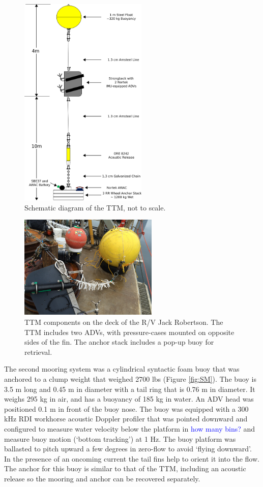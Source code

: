 \documentclass[twocol]{ametsoc}
\newcommand{\note}[1]{\textcolor{blue}{#1}}
\begin{document}
\begin{figure}[t]
  \centering
  \includegraphics[width=2.4in]{ttm04b}
  \caption{Schematic diagram of the TTM, not to scale.}
  \label{fig:ttm:diagram}
\end{figure}

\begin{figure}[t]
  \centering
  \includegraphics[width=2.6in]{TTM_image01}  
  \caption{TTM components on the deck of the R/V Jack Robertson. The TTM includes two ADVs, with pressure-cases mounted on opposite sides of the fin. The anchor stack includes a pop-up buoy for retrieval. }
  \label{fig:ttm:photo}
\end{figure}

The second mooring system was a cylindrical syntactic foam buoy that was anchored to a clump weight that weighed 2700 lbs (Figure \ref{fig:SM}). The buoy is 3.5 m long and 0.45 m in diameter with a tail ring that is 0.76 m in diameter. It weighs 295 kg in air, and has a buoyancy of 185 kg in water. An ADV head was positioned 0.1 m in front of the buoy nose.  The buoy was equipped with a 300 kHz RDI workhorse acoustic Doppler profiler that was pointed downward and configured to measure water velocity below the platform in \note{how many bins?} and measure buoy motion (`bottom tracking') at 1 Hz. The buoy platform was ballasted to pitch upward a few degrees in zero-flow to avoid `flying downward'. In the presence of an oncoming current the tail fins help to orient it into the flow. The anchor for this buoy is similar to that of the TTM, including an acoustic release so the mooring and anchor can be recovered separately.
\end{document}
